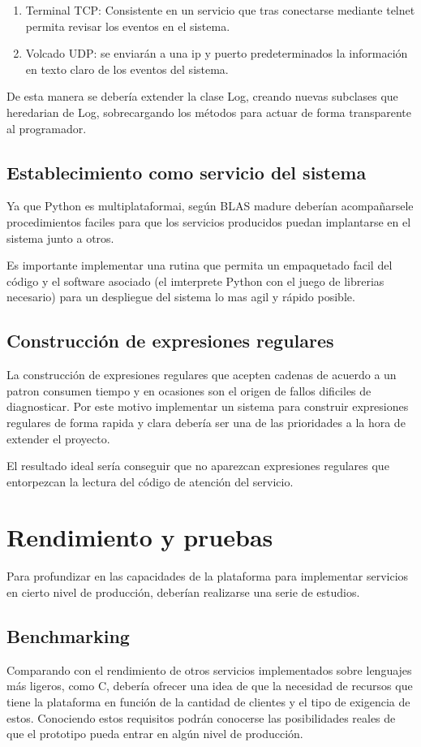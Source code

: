 \documentclass[a4paper,spanish,12pt]{book}
\begin{document}
\begin{enumerate}
	\item{Terminal TCP: Consistente en un servicio que tras conectarse mediante telnet permita revisar los eventos en el sistema.}
	\item{Volcado UDP: se enviarán a una ip y puerto predeterminados la información en texto claro de los eventos del sistema.}
\end{enumerate}

De esta manera se debería extender la clase Log, creando nuevas subclases que heredarian de Log, sobrecargando los m\'etodos para actuar de forma transparente al programador.


\subsection{Establecimiento como servicio del sistema}
Ya que Python es multiplataformai, según BLAS madure deberían acompañarsele procedimientos faciles para que los servicios producidos puedan implantarse en el sistema junto a otros.


Es importante implementar una rutina que permita un empaquetado facil del código y el software asociado (el imterprete Python con el juego de librerias necesario) para un despliegue del sistema lo mas agil y rápido posible.

\subsection{Construcción de expresiones regulares}
La construcción de expresiones regulares que acepten cadenas de acuerdo a un patron consumen tiempo y en ocasiones son el origen de fallos dificiles de diagnosticar. Por este motivo implementar un sistema para construir expresiones regulares de forma rapida y clara debería ser una de las prioridades a la hora de extender el proyecto.

El resultado ideal sería conseguir que no aparezcan expresiones regulares que entorpezcan la lectura del código de atención del servicio.
\section{Rendimiento y pruebas}
Para profundizar en las capacidades de la plataforma para implementar servicios en cierto nivel de producción, deberían realizarse una serie de estudios.
\subsection{Benchmarking}
Comparando con el rendimiento de otros servicios implementados sobre lenguajes más ligeros, como C, debería ofrecer una idea de que la necesidad de recursos que tiene la plataforma en función de la cantidad de clientes y el tipo de exigencia de estos. Conociendo estos requisitos podrán conocerse las posibilidades reales de que el prototipo pueda entrar en algún nivel de producción.
\end{document}
